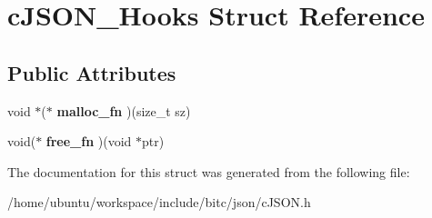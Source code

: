 \hypertarget{structcJSON__Hooks}{\section{c\-J\-S\-O\-N\-\_\-\-Hooks Struct Reference}
\label{structcJSON__Hooks}
}
\subsection*{Public Attributes}
\begin{DoxyCompactItemize}
\item 
\hypertarget{structcJSON__Hooks_a55ba326511f34ee6e380286c9dcf4a25}{void $\ast$($\ast$ {\bfseries malloc\-\_\-fn} )(size\-\_\-t sz)}\label{structcJSON__Hooks_a55ba326511f34ee6e380286c9dcf4a25}

\item 
\hypertarget{structcJSON__Hooks_a97927334c2456b8555df5b4568ef28fc}{void($\ast$ {\bfseries free\-\_\-fn} )(void $\ast$ptr)}\label{structcJSON__Hooks_a97927334c2456b8555df5b4568ef28fc}

\end{DoxyCompactItemize}


The documentation for this struct was generated from the following file\-:\begin{DoxyCompactItemize}
\item 
/home/ubuntu/workspace/include/bitc/json/c\-J\-S\-O\-N.\-h\end{DoxyCompactItemize}
